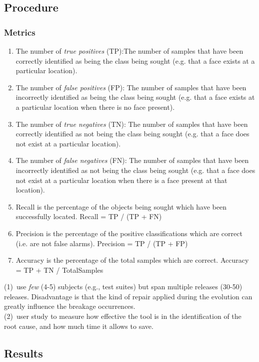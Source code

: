 \subsection{Procedure}\label{sec:procedure}

\subsubsection{Metrics}

\begin{enumerate}
\item The number of \textit{true positives} (TP):The number of samples that have been correctly identified as being the class being sought (e.g. that a face exists at a particular location).
\item The number of \textit{false positives} (FP): The number of samples that have been incorrectly identified as being the class being sought (e.g. that a face exists at a particular location when there is no face present).
\item The number of \textit{true negatives} (TN): The number of samples that have been correctly identified as not being the class being sought (e.g. that a face does not exist at a particular location).
\item The number of \textit{false negatives} (FN): The number of samples that have been incorrectly identified as not being the class being sought (e.g. that a face does not exist at a particular location when there is a face present at that location).
\item Recall is the percentage of the objects being sought which have been successfully located. Recall = TP / (TP + FN)
\item Precision is the percentage of the positive classifications which are correct (i.e. are not false alarms). Precision = TP / (TP + FP)
\item Accuracy is the percentage of the total samples which are correct. Accuracy = TP + TN / TotalSamples
\end{enumerate}


\noindent
(1)~use \textit{few} (4-5) subjects (e.g., test suites) but span multiple releases  (30-50) releases. Disadvantage is that the kind of repair applied during the evolution can greatly influence the breakage occurrences. \\

\noindent
(2)~user study to measure how effective the tool is in the identification of the root cause, and how much time it allows to save.

\subsection{Results}\label{sec:results}












